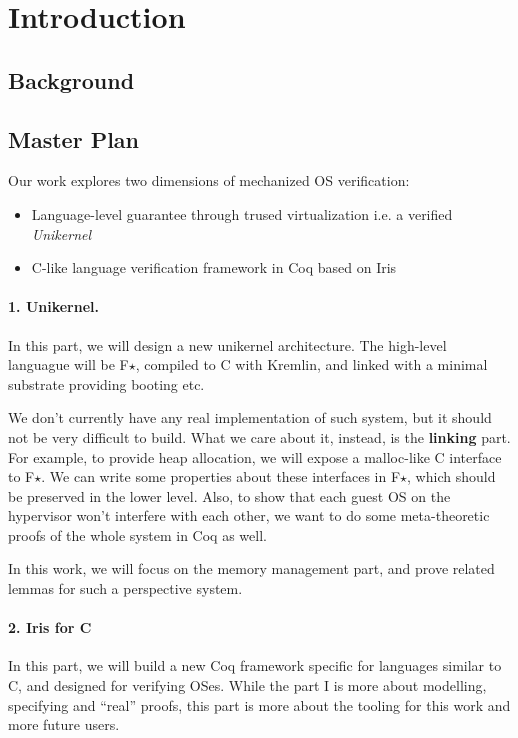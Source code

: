 \section{Introduction}
\label{sec:intro}

\subsection{Background}

\subsection{Master Plan}

Our work explores two dimensions of mechanized OS verification:

\begin{itemize}
\item Language-level guarantee through trused virtualization i.e. a verified \emph{Unikernel}
\item C-like language verification framework in Coq based on Iris
\end{itemize}

\paragraph{1. Unikernel.} In this part, we will design a new unikernel architecture. The high-level
languague will be F$\star$, compiled to C with Kremlin,
and linked with a minimal substrate providing booting etc.

We don't currently have any real implementation of such system, but it should not be very difficult to build.
What we care about it, instead, is the \textbf{linking} part.
For example, to provide heap allocation, we will expose a malloc-like C interface to F$\star$. We can write
some properties about these interfaces in F$\star$, which should be preserved in the lower level. Also, to show
that each guest OS on the hypervisor won't interfere with each other, we want to do some meta-theoretic proofs
of the whole system in Coq as well.

In this work, we will focus on the memory management part,
and prove related lemmas for such a perspective system.

\paragraph{2. Iris for C} In this part, we will build a new Coq framework specific for languages similar to C,
and designed for verifying OSes. While the part I is more about modelling, specifying and ``real'' proofs, this
part is more about the tooling for this work and more future users.

